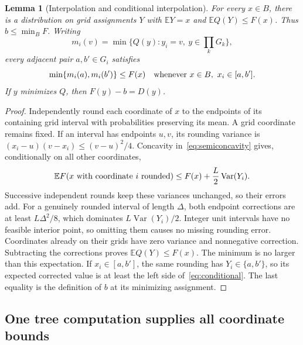 \documentclass[11pt]{article}
\newtheorem{lemma}[theorem]{Lemma}
\theoremstyle{remark}
\newcommand{\E}{\mathbb E}
\begin{document}
\begin{lemma}[Interpolation and conditional interpolation]\label{lem:round}
For every $x\in B$, there is a distribution on grid assignments $Y$ with
$\E Y=x$ and $\E Q(Y)\le F(x)$. Thus $b\le\min_B F$.
Writing
\[
m_i(v)=\min\{Q(y):y_i=v,\ y\in\textstyle\prod_kG_k\},
\]
every adjacent pair $a,b'\in G_i$ satisfies
\begin{equation}\label{eq:conditional}
\min\{m_i(a),m_i(b')\}\le F(x)
\quad\hbox{whenever }x\in B,\ x_i\in[a,b'].
\end{equation}
If $y$ minimizes $Q$, then $F(y)-b=D(y)$.
\end{lemma}
\begin{proof}
Independently round each coordinate of $x$ to the endpoints of its
containing grid interval with probabilities preserving its mean. A grid
coordinate remains fixed. If an interval has endpoints $u,v$, its
rounding variance is $(x_i-u)(v-x_i)\le(v-u)^2/4$.
Concavity in~\eqref{eq:semiconcavity} gives, conditionally on all other
coordinates,
\[
\E F(x\hbox{ with coordinate }i\hbox{ rounded})
\le F(x)+\frac L2\operatorname{Var}(Y_i).
\]
Successive independent rounds keep these variances unchanged, so their
errors add. For a genuinely rounded interval of length $\Delta$, both
endpoint corrections are at least $L\Delta^2/8$, which dominates
$L\operatorname{Var}(Y_i)/2$. Integer unit intervals have no feasible
interior point, so omitting them causes no missing rounding error.
Coordinates already on their grids have zero variance and nonnegative
correction. Subtracting the corrections proves $\E Q(Y)\le F(x)$.
The minimum is no larger than this expectation. If $x_i\in[a,b']$,
the same rounding has $Y_i\in\{a,b'\}$, so its expected corrected value
is at least the left side of~\eqref{eq:conditional}. The last equality
is the definition of $b$ at its minimizing assignment.
\end{proof}

\subsection{One tree computation supplies all coordinate bounds}
\end{document}
